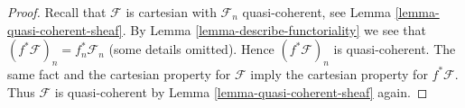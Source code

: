 \documentclass{stacks-project}
\theoremstyle{plain}
\theoremstyle{definition}
\theoremstyle{remark}
\numberwithin{equation}{subsection}
\begin{document}
\begin{proof}
Recall that $\mathcal{F}$ is cartesian with $\mathcal{F}_n$
quasi-coherent, see Lemma \ref{lemma-quasi-coherent-sheaf}.
By Lemma \ref{lemma-describe-functoriality} we see that
$(f^*\mathcal{F})_n = f_n^*\mathcal{F}_n$ (some details omitted).
Hence $(f^*\mathcal{F})_n$ is quasi-coherent.
The same fact and the cartesian property for $\mathcal{F}$
imply the cartesian property for $f^*\mathcal{F}$.
Thus $\mathcal{F}$ is quasi-coherent by
Lemma \ref{lemma-quasi-coherent-sheaf} again.
\end{proof}
\end{document}
